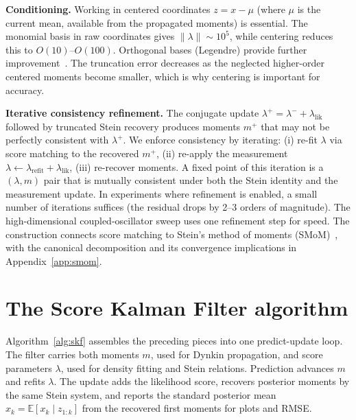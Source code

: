 \documentclass{article}
\newcommand{\E}{\mathbb{E}}
\theoremstyle{definition}
\begin{document}
\textbf{Conditioning.}
Working in centered coordinates $z = x - \mu$ (where $\mu$ is the
current mean, available from the propagated moments) is essential.
The monomial basis in raw coordinates gives $\|\lambda\| \sim 10^5$,
while centering reduces this to $O(10)$--$O(100)$.
Orthogonal bases (Legendre) provide further improvement~\cite{liu2026mepoly}.
The truncation error decreases as the neglected
higher-order centered moments become smaller,
which is why centering is important for accuracy.

\textbf{Iterative consistency refinement.}
The conjugate update $\lambda^+ = \lambda^- + \lambda_{\mathrm{lik}}$
followed by truncated Stein recovery produces moments $m^+$ that may
not be perfectly consistent with $\lambda^+$.
We enforce consistency by iterating: (i) re-fit $\lambda$ via score
matching to the recovered $m^+$, (ii) re-apply the measurement
$\lambda \leftarrow \lambda_{\mathrm{refit}} + \lambda_{\mathrm{lik}}$,
(iii) re-recover moments.
A fixed point of this iteration is a $(\lambda, m)$ pair that is
mutually consistent under both the Stein identity and the
measurement update.
In experiments where refinement is enabled, a small number of
iterations suffices (the residual drops by 2--3 orders of magnitude).
The high-dimensional coupled-oscillator sweep uses one refinement step
for speed.
The construction connects score matching to Stein's method of moments
(SMoM)~\cite{kume2026,nagai2026}, with the canonical decomposition and
its convergence implications in Appendix~\ref{app:smom}.

\section{The Score Kalman Filter algorithm}
\label{sec:skf}

Algorithm~\ref{alg:skf} assembles the preceding pieces into one
predict-update loop. The filter carries both moments $m$, used for
Dynkin propagation, and score parameters $\lambda$, used for density
fitting and Stein relations. Prediction advances $m$ and refits
$\lambda$. The update adds the likelihood score, recovers posterior
moments by the same Stein system, and reports the standard posterior
mean $\hat{x}_k = \E[x_k \mid z_{1:k}]$ from the recovered first moments
for plots and RMSE.
\end{document}
